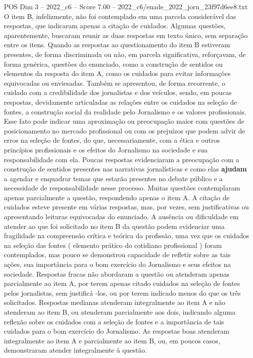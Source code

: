 \begin{textsample}{POS Dim 3 – 2022\_c6 – Score 7.00 – 2022\_c6/enade\_2022\_jorn\_23f97d6ee8.txt}
O item B, infelizmente, não foi contemplado em uma parcela considerável das respostas, que indicaram apenas a citação de cuidados.
Algumas questões, aparentemente, buscaram reunir as duas respostas em texto único, sem separação entre os itens.
Quando as respostas ao questionamento do item B estiveram presentes, de forma discriminada ou não, em parcela significativa, reforçavam, de forma genérica, questões do enunciado, como a construção de sentidos ou elementos da resposta do item A, como os cuidados para evitar informações equivocadas ou enviesadas.
Também se apresentou, de forma recorrente, o cuidado com a credibilidade dos jornalistas e dos veículos, sendo, em poucas respostas, devidamente articuladas as relações entre os cuidados na seleção de fontes, a construção social da realidade pelo Jornalismo e os valores profissionais.
Esse fato pode indicar uma aproximação ou preocupação maior com questões de posicionamento no mercado profissional ou com os prejuízos que podem advir de erros na seleção de fontes, do que, necessariamente, com a ética e outros princípios profissionais e os efeitos do Jornalismo na sociedade e sua responsabilidade com ela.
Poucas respostas evidenciaram a preocupação com a construção de sentidos presentes nas narrativas jornalísticas e como elas \textbf{ajudam} a agendar e enquadrar temas que estarão presentes no debate público e a necessidade de responsabilidade nesse processo.
Muitas questões contemplaram apenas parcialmente a questão, respondendo apenas o item A.
A citação de cuidados esteve presente em várias respostas, mas, por vezes, sem justificativas ou apresentando leituras equivocadas do enunciado.
A ausência ou dificuldade em atender ao que foi solicitado no item B da questão podem evidenciar uma fragilidade na compreensão crítica e teórica da profissão, uma vez que os cuidados na seleção das fontes ( elemento prático do cotidiano profissional ) foram contemplados, mas pouco se demonstrou capacidade de refletir sobre as tais ações, sua importância para o bom exercício do Jornalismo e seus efeitos na sociedade.
Respostas fracas não abordaram a questão ou atenderam apenas parcialmente ao item A, por terem apenas citado cuidados na seleção de fontes pelos jornalistas, sem justificá -los, ou por terem indicado menos do que os três solicitados.
Respostas medianas atenderam integralmente ao item A e não atenderam ao item B, ou atenderam parcialmente aos dois, indicando alguma reflexão sobre os cuidados com a seleção de fontes e a importância de tais cuidados para o bom exercício do Jornalismo.
As respostas boas atenderam integralmente ao item A e parcialmente ao item B, ou, em poucos casos, demonstraram atender integralmente à questão.

\end{textsample}

